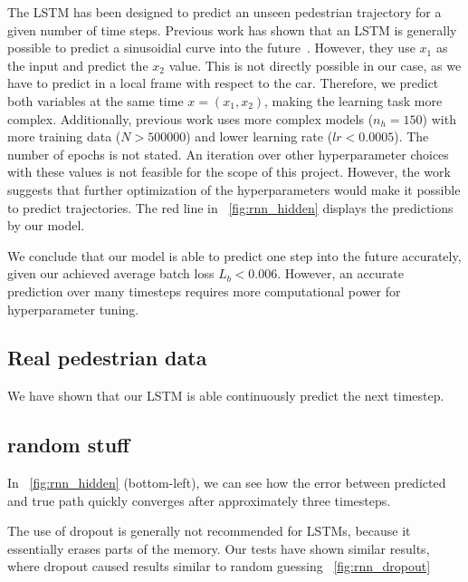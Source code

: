 The LSTM has been designed to predict an unseen pedestrian trajectory for a given number of time steps.
Previous work has shown that an LSTM is generally possible to predict a sinusoidial curve into the future~\cite{sunsided}.
However, they use $x_1$ as the input and predict the $x_2$ value.
This is not directly possible in our case, as we have to predict in a local frame with respect to the car.
Therefore, we predict both variables at the same time $x = (x_1, x_2)$, making the learning task more complex.
Additionally, previous work uses more complex models ($n_h=150$) with more training data ($N>500000$) and lower learning rate ($lr<0.0005$).
The number of epochs is not stated.
An iteration over other hyperparameter choices with these values is not feasible for the scope of this project.
However, the work suggests that further optimization of the hyperparameters would make it possible to predict trajectories.
The red line in ~\cref{fig:rnn_hidden} displays the predictions by our model. 

We conclude that our model is able to predict one step into the future accurately, given our achieved average batch loss $L_b<0.006$.
However, an accurate prediction over many timesteps requires more computational power for hyperparameter tuning. 

\subsection{Real pedestrian data}

We have shown that our LSTM is able continuously predict the next timestep. 






\subsection{random stuff}


In ~\cref{fig:rnn_hidden} (bottom-left), we can see how the error between predicted and true path quickly converges after approximately three timesteps.

The use of dropout is generally not recommended for LSTMs, because it essentially erases parts of the memory. Our tests have shown similar results, where dropout caused results similar to random guessing ~\cref{fig:rnn_dropout}

